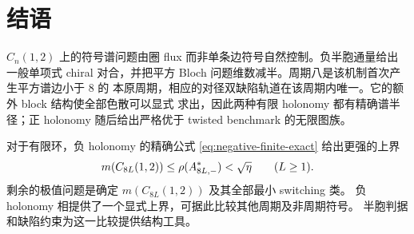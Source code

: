 \section{结语}
\label{sec:conclusion}

$C_n(1,2)$ 上的符号谱问题由圈 flux 而非单条边符号自然控制。负半胞通量给出一般单项式
chiral 对合，并把平方 Bloch 问题维数减半。周期八是该机制首次产生平方谱边小于 $8$ 的
本原周期，相应的对径双缺陷轨道在该周期内唯一。它的额外 block 结构使全部色散可以显式
求出，因此两种有限 holonomy 都有精确谱半径；正 holonomy 随后给出严格优于 twisted
benchmark 的无限图族。

对于有限环，负 holonomy 的精确公式 \eqref{eq:negative-finite-exact}
给出更强的上界
\[
 m(C_{8L}(1,2))\leq\rho(A_{8L,-}^{*})<\sqrt{\eta}
 \qquad(L\geq1).
\]
剩余的极值问题是确定 $m(C_{8L}(1,2))$ 及其全部最小 switching 类。
负 holonomy 相提供了一个显式上界，可据此比较其他周期及非周期符号。
半胞判据和缺陷约束为这一比较提供结构工具。
